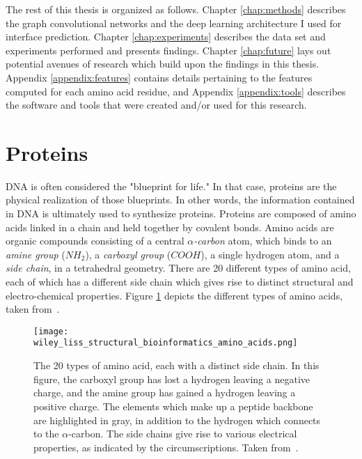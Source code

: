 The rest of this thesis is organized as follows.
Chapter \ref{chap:methods} describes the graph convolutional networks and the deep learning architecture I used for interface prediction.
Chapter \ref{chap:experiments} describes the data set and experiments performed and presents findings. 
Chapter \ref{chap:future} lays out potential avenues of research which build upon the findings in this thesis. 
Appendix \ref{appendix:features} contains details pertaining to the features computed for each amino acid residue, and Appendix \ref{appendix:tools} describes the software and tools that were created and/or used for this research.

\section{Proteins}

DNA is often considered the "blueprint for life." 
In that case, proteins are the physical realization of those blueprints.
In other words, the information contained in DNA is ultimately used to synthesize proteins.
Proteins are composed of amino acids linked in a chain and held together by covalent bonds.
Amino acids are organic compounds consisting of a central \textit{$\alpha$-carbon} atom, which binds to an \textit{amine group} ($NH_2$), a \textit{carboxyl group} ($COOH$), a single hydrogen atom, and a \textit{side chain}, in a tetrahedral geometry.
There are 20 different types of amino acid, each of which has a different side chain which gives rise to distinct structural and electro-chemical properties.
Figure \ref{fig:aminoacids} depicts the different types of amino acids, taken from~\cite{scheeffink2003}.


\begin{figure}
	\centering
	\texttt{[image: wiley\_liss\_structural\_bioinformatics\_amino\_acids.png]}
	\caption{The 20 types of amino acid, each with a distinct side chain. In this figure, the carboxyl group has lost a hydrogen leaving a negative charge, and the amine group has gained a hydrogen leaving a positive charge. The elements which make up a peptide backbone are highlighted in gray, in addition to the hydrogen which connects to the $\alpha$-carbon. The side chains give rise to various electrical properties, as indicated by the circumscriptions. Taken from~\cite{scheeffink2003}.}
	\label{fig:aminoacids}
\end{figure}

